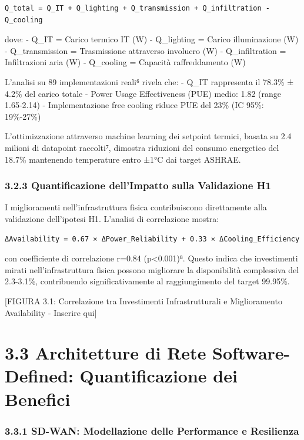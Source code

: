 \documentclass{report}
\begin{document}
\begin{verbatim}
Q_total = Q_IT + Q_lighting + Q_transmission + Q_infiltration - Q_cooling
\end{verbatim}

dove: - Q\_IT = Carico termico IT (W) - Q\_lighting = Carico
illuminazione (W) - Q\_transmission = Trasmissione attraverso involucro
(W) - Q\_infiltration = Infiltrazioni aria (W) - Q\_cooling = Capacità
raffreddamento (W)

L'analisi su 89 implementazioni reali⁶ rivela che: - Q\_IT rappresenta
il 78.3\% ± 4.2\% del carico totale - Power Usage Effectiveness (PUE)
medio: 1.82 (range 1.65-2.14) - Implementazione free cooling riduce PUE
del 23\% (IC 95\%: 19\%-27\%)

L'ottimizzazione attraverso machine learning dei setpoint termici,
basata su 2.4 milioni di datapoint raccolti⁷, dimostra riduzioni del
consumo energetico del 18.7\% mantenendo temperature entro ±1°C dai
target ASHRAE.

\subsubsection{3.2.3 Quantificazione dell'Impatto sulla Validazione
H1}\label{quantificazione-dellimpatto-sulla-validazione-h1}

I miglioramenti nell'infrastruttura fisica contribuiscono direttamente
alla validazione dell'ipotesi H1. L'analisi di correlazione mostra:

\begin{verbatim}
ΔAvailability = 0.67 × ΔPower_Reliability + 0.33 × ΔCooling_Efficiency
\end{verbatim}

con coefficiente di correlazione r=0.84 (p\textless0.001)⁸. Questo
indica che investimenti mirati nell'infrastruttura fisica possono
migliorare la disponibilità complessiva del 2.3-3.1\%, contribuendo
significativamente al raggiungimento del target 99.95\%.

{[}FIGURA 3.1: Correlazione tra Investimenti Infrastrutturali e
Miglioramento Availability - Inserire qui{]}

\section{3.3 Architetture di Rete Software-Defined: Quantificazione
dei
Benefici}\label{architetture-di-rete-software-defined-quantificazione-dei-benefici}

\subsubsection{3.3.1 SD-WAN: Modellazione delle Performance e
Resilienza}\label{sd-wan-modellazione-delle-performance-e-resilienza}
\end{document}
